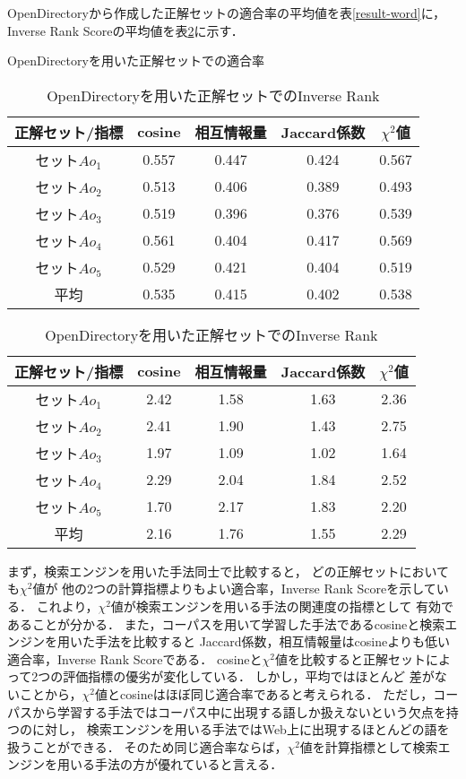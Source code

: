 \documentclass[japanese]{jnlp_1.3a}
\begin{document}
OpenDirectoryから作成した正解セットの適合率の平均値を表\ref{result-word}に，
Inverse Rank Scoreの平均値を表\ref{result-word-inv}に示す．

\begin{table}[b]
	\begin{center}
	 \caption{OpenDirectoryを用いた正解セットでの適合率}
	 \label{result-word}
	 \begin{tabular}{c|c|c|c|c}
	  正解セット/指標 & cosine & 相互情報量 & Jaccard係数 & $\chi^2$値 \\ \hline
	セット$Ao_1$ & 0.557 & 0.447 & 0.424 & 0.567 \\ 
	セット$Ao_2$ & 0.513 & 0.406 & 0.389 & 0.493 \\ 
	セット$Ao_3$ & 0.519 & 0.396 & 0.376 & 0.539 \\ 
	セット$Ao_4$ & 0.561 & 0.404 & 0.417 & 0.569 \\ 
	セット$Ao_5$ & 0.529 & 0.421 & 0.404 & 0.519 \\ \hline
	  平均 & 0.535 & 0.415 & 0.402 & 0.538 \\ 
	 \end{tabular}
    \vspace{\baselineskip}

	 \caption{OpenDirectoryを用いた正解セットでのInverse Rank}
	 \label{result-word-inv}
	 \begin{tabular}{c|c|c|c|c}
	  正解セット/指標 & cosine & 相互情報量 & Jaccard係数 & $\chi^2$値 \\ \hline
	セット$Ao_1$ & 2.42 & 1.58 & 1.63 & 2.36 \\ 
	セット$Ao_2$ & 2.41 & 1.90 & 1.43 & 2.75 \\ 
	セット$Ao_3$ & 1.97 & 1.09 & 1.02 & 1.64 \\ 
	セット$Ao_4$ & 2.29 & 2.04 & 1.84 & 2.52 \\ 
	セット$Ao_5$ & 1.70 & 2.17 & 1.83 & 2.20 \\ \hline
	  平均 & 2.16  & 1.76 & 1.55 & 2.29 \\ 
	 \end{tabular}
	\end{center}
\end{table}
まず，検索エンジンを用いた手法同士で比較すると，
どの正解セットにおいても$\chi^2$値が
他の2つの計算指標よりもよい適合率，Inverse Rank Scoreを示している．
これより，$\chi^2$値が検索エンジンを用いる手法の関連度の指標として
有効であることが分かる．
また，コーパスを用いて学習した手法であるcosineと検索エンジンを用いた手法を比較すると
Jaccard係数，相互情報量はcosineよりも低い適合率，Inverse Rank Scoreである．
cosineと$\chi^2$値を比較すると正解セットによって2つの評価指標の優劣が変化している．
しかし，平均ではほとんど
差がないことから，$\chi^2$値とcosineはほぼ同じ適合率であると考えられる．
ただし，コーパスから学習する手法ではコーパス中に出現する語しか扱えないという欠点を持つのに対し，
検索エンジンを用いる手法ではWeb上に出現するほとんどの語を扱うことができる．
そのため同じ適合率ならば，$\chi^2$値を計算指標として検索エンジンを用いる手法の方が優れていると言える．
\end{document}
